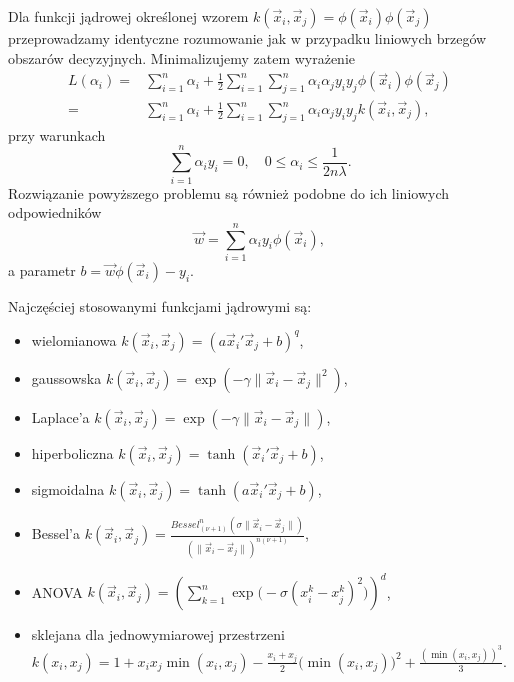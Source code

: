 \documentclass[
]{book}
\providecommand{\tightlist}{%
  \setlength{\itemsep}{0pt}\setlength{\parskip}{0pt}}
\theoremstyle{plain}
\theoremstyle{definition}
\theoremstyle{definition}
\theoremstyle{definition}
\theoremstyle{definition}
\theoremstyle{remark}
\begin{document}
Dla funkcji jądrowej określonej wzorem \(k(\vec{x}_i,\vec{x}_j)=\phi(\vec{x}_i)\phi(\vec{x}_j)\) przeprowadzamy identyczne rozumowanie jak w przypadku liniowych brzegów obszarów decyzyjnych.
Minimalizujemy zatem wyrażenie
\begin{align}
    L(\alpha_i) =& \sum_{i=1}^{n}\alpha_i+\frac{1}{2}\sum_{i=1}^{n}\sum_{j=1}^{n}\alpha_i\alpha_jy_iy_j\phi(\vec{x}_i)\phi(\vec{x}_j)\\
        =&\sum_{i=1}^{n}\alpha_i+\frac{1}{2}\sum_{i=1}^{n}\sum_{j=1}^{n}\alpha_i\alpha_jy_iy_jk(\vec{x}_i,\vec{x}_j),
        \label{eq:strata4}
\end{align}
przy warunkach
\begin{equation}
    \sum_{i=1}^{n}\alpha_iy_i=0,\quad 0\leq \alpha_i\leq \frac{1}{2n\lambda}.
    \label{eq:nier3}
\end{equation}
Rozwiązanie powyższego problemu są również podobne do ich liniowych odpowiedników
\begin{equation}
    \vec{w}=\sum_{i=1}^{n}\alpha_iy_i\phi(\vec{x}_i),
    \label{eq:wagi3}
\end{equation}
a parametr \(b=\vec{w}\phi(\vec{x}_i)-y_i\).

Najczęściej stosowanymi funkcjami jądrowymi są:

\begin{itemize}
\tightlist
\item
  wielomianowa \(k(\vec{x}_i,\vec{x}_j)=(a\vec{x}_i'\vec{x}_j+b)^q\),
\item
  gaussowska \(k(\vec{x}_i,\vec{x}_j)=\exp(-\gamma\|\vec{x}_i-\vec{x}_j\|^2)\),
\item
  Laplace'a \(k(\vec{x}_i,\vec{x}_j)=\exp(-\gamma\|\vec{x}_i-\vec{x}_j\|)\),
\item
  hiperboliczna \(k(\vec{x}_i,\vec{x}_j)=\tanh(\vec{x}_i'\vec{x}_j+b)\),
\item
  sigmoidalna \(k(\vec{x}_i,\vec{x}_j)=\tanh(a\vec{x}_i'\vec{x}_j+b)\),
\item
  Bessel'a \(k(\vec{x}_i,\vec{x}_j)=\frac{Bessel^n_{(\nu+1)}(\sigma\|\vec{x}_i-\vec{x}_j\|)}{(\|\vec{x}_i-\vec{x}_j\|)^{n(\nu+1)}}\),
\item
  ANOVA \(k(\vec{x}_i,\vec{x}_j)=\left(\sum_{k=1}^{n}\exp\big(-\sigma(x^k_i-x^k_j)^2\big)\right)^d\),
\item
  sklejana dla jednowymiarowej przestrzeni \(k(x_i,x_j)=1+x_ix_j\min(x_i,x_j)-\frac{x_i+x_j}{2}\big(\min(x_i,x_j)\big)^2+\frac{(\min(x_i,x_j))^3}{3}\).
\end{itemize}
\end{document}
